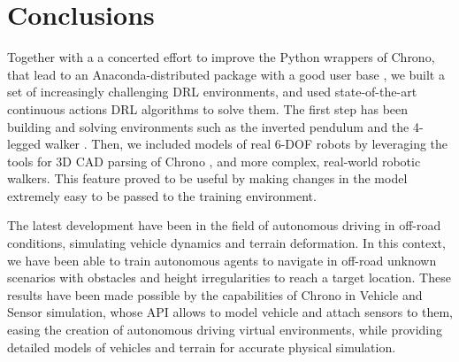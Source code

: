 \documentclass{svproc}
\begin{document}
\section{Conclusions}
Together with a a concerted effort to improve the Python wrappers of Chrono, that lead to an Anaconda-distributed package with a good user base \cite{pyChronoCondaWebSite}, we built a set of increasingly challenging DRL environments, and used state-of-the-art continuous actions DRL algorithms to solve them. The first step has been building and solving environments such as the inverted pendulum and the 4-legged walker \cite{Benatti194Legs}. Then, we included models of real 6-DOF robots by leveraging the tools for 3D CAD parsing of Chrono \cite{Benatti19Solidworks}, and more complex, real-world robotic walkers. This feature proved to be useful by making changes in the model extremely easy to be passed to the training environment.

The latest development have been in the field of autonomous driving in off-road conditions, simulating vehicle dynamics and terrain deformation. In this context, we have been able to train autonomous agents to navigate in off-road unknown scenarios with obstacles and height irregularities to reach a target location.
These results have been made possible by the capabilities of Chrono in Vehicle and Sensor simulation, whose API allows to model vehicle and attach sensors to them, easing the creation of autonomous driving virtual environments, while providing detailed models of vehicles and terrain for accurate physical simulation.



\end{document}
